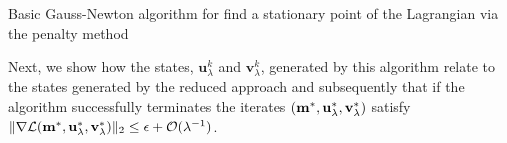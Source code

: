 \documentclass{iopart}
\begin{document}
\begin{algorithm}
\caption{Basic Gauss-Newton algorithm for find a stationary point of the Lagrangian via the penalty method}
\label{alg:penalty}
\begin{algorithmic}

\vspace{1mm}
\vspace{2mm}
\vspace{1mm}
\STATE{determine steplength $\alpha^k \in (0,1]$}
\vspace{1mm}
\vspace{1mm}
\vspace{2mm}
\vspace{1mm}
\ENDWHILE
\end{algorithmic}
\end{algorithm}
%

Next, we show how the states, $\mathbf{u}^k_{\lambda}$ and $\mathbf{v}^k_{\lambda}$, generated by this algorithm  relate to the states generated by the reduced approach and subsequently that if the algorithm successfully terminates the iterates $(\mathbf{m}^*, \mathbf{u}^*_{\lambda}, \mathbf{v}^*_{\lambda})$ satisfy $\|\nabla\mathcal{L}(\mathbf{m}^*, \mathbf{u}^*_{\lambda}, \mathbf{v}^*_{\lambda})\|_2 \leq \epsilon + \mathcal{O}(\lambda^{-1})$. 
\end{document}
